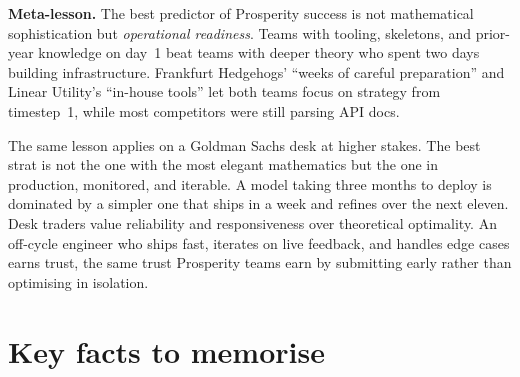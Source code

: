 
\begin{prosperitybox}
\textbf{Meta-lesson.}  The best predictor of Prosperity success
is not mathematical sophistication but \emph{operational
readiness}.  Teams with tooling, skeletons, and prior-year
knowledge on day~1 beat teams with deeper theory who spent two
days building infrastructure.  Frankfurt Hedgehogs' ``weeks of
careful preparation'' and Linear Utility's ``in-house tools''
let both teams focus on strategy from timestep~1, while most
competitors were still parsing API docs.
\end{prosperitybox}

\begin{gsbox}
The same lesson applies on a Goldman Sachs desk at higher stakes.
The best strat is not the one with the most elegant mathematics
but the one in production, monitored, and iterable.  A model
taking three months to deploy is dominated by a simpler one that
ships in a week and refines over the next eleven.  Desk traders
value reliability and responsiveness over theoretical optimality.
An off-cycle engineer who ships fast, iterates on live feedback,
and handles edge cases earns trust, the same trust Prosperity
teams earn by submitting early rather than optimising in
isolation.
\end{gsbox}


\section{Key facts to memorise}
\label{sec:top_team_key_facts}

